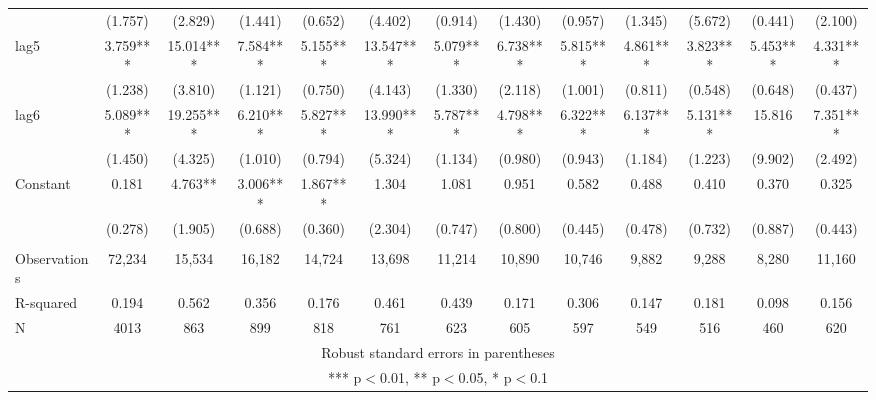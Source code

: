 \begin{tabular}{lcccccccccccc}
 & (1.757) & (2.829) & (1.441) & (0.652) & (4.402) & (0.914) & (1.430) & (0.957) & (1.345) & (5.672) & (0.441) & (2.100) \\
lag5 & 3.759*** & 15.014*** & 7.584*** & 5.155*** & 13.547*** & 5.079*** & 6.738*** & 5.815*** & 4.861*** & 3.823*** & 5.453*** & 4.331*** \\
 & (1.238) & (3.810) & (1.121) & (0.750) & (4.143) & (1.330) & (2.118) & (1.001) & (0.811) & (0.548) & (0.648) & (0.437) \\
lag6 & 5.089*** & 19.255*** & 6.210*** & 5.827*** & 13.990*** & 5.787*** & 4.798*** & 6.322*** & 6.137*** & 5.131*** & 15.816 & 7.351*** \\
 & (1.450) & (4.325) & (1.010) & (0.794) & (5.324) & (1.134) & (0.980) & (0.943) & (1.184) & (1.223) & (9.902) & (2.492) \\
Constant & 0.181 & 4.763** & 3.006*** & 1.867*** & 1.304 & 1.081 & 0.951 & 0.582 & 0.488 & 0.410 & 0.370 & 0.325 \\
 & (0.278) & (1.905) & (0.688) & (0.360) & (2.304) & (0.747) & (0.800) & (0.445) & (0.478) & (0.732) & (0.887) & (0.443) \\
 &  &  &  &  &  &  &  &  &  &  &  &  \\
Observations & 72,234 & 15,534 & 16,182 & 14,724 & 13,698 & 11,214 & 10,890 & 10,746 & 9,882 & 9,288 & 8,280 & 11,160 \\
R-squared & 0.194 & 0.562 & 0.356 & 0.176 & 0.461 & 0.439 & 0.171 & 0.306 & 0.147 & 0.181 & 0.098 & 0.156 \\
 N & 4013 & 863 & 899 & 818 & 761 & 623 & 605 & 597 & 549 & 516 & 460 & 620 \\ \hline
\multicolumn{13}{c}{ Robust standard errors in parentheses} \\
\multicolumn{13}{c}{ *** p$<$0.01, ** p$<$0.05, * p$<$0.1} \\
\end{tabular}

